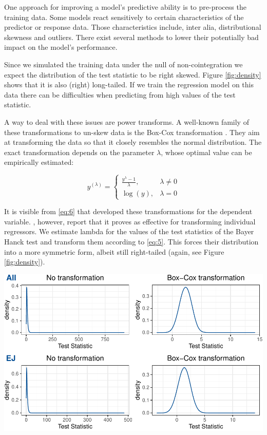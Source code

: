 \documentclass[12pt,a4paper]{article}
\let\origfigure\figure
\let\endorigfigure\endfigure
\renewenvironment{figure}[1][2] {
    \expandafter\origfigure\expandafter[H]
} {
    \endorigfigure
}
\begin{document}
One approach for improving a model's predictive ability is to
pre-process the training data. Some models react sensitively to certain
characteristics of the predictor or response data. Those characteristics
include, inter alia, distributional skewness and outliers. There exist
several methods to lower their potentially bad impact on the model's
performance.

Since we simulated the training data under the null of non-cointegration
we expect the distribution of the test statistic to be right skewed.
Figure \ref{fig:density} shows that it is also (right) long-tailed. If
we train the regression model on this data there can be difficulties
when predicting from high values of the test statistic.

A way to deal with these issues are power transforms. A well-known
family of these transformations to un-skew data is the Box-Cox
transformation \autocite{Boxcox_1964}. They aim at transforming the data
so that it closely resembles the normal distribution. The exact
transformation depends on the parameter \(\lambda\), whose optimal value
can be empirically estimated:

\begin{equation}
y^{(\lambda)} =
    \begin{cases}
    \frac{y^{\lambda} - 1}{\lambda}, & \lambda \neq 0 \\
    \log{(y)}, & \lambda = 0
    \end{cases}
\label{eq:6}
\end{equation}

It is visible from \eqref{eq:6} that \textcite{Boxcox_1964} developed
these transformations for the dependent variable. \textcite{Kuhn_2013},
however, report that it proves as effective for transforming individual
regressors. We estimate lambda for the values of the test statistics of
the Bayer Hanck test and transform them according to \eqref{eq:5}. This
forces their distribution into a more symmetric form, albeit still
right-tailed (again, see Figure \ref{fig:density}).

\begin{figure}
\centering
\includegraphics{p_approx_paper_files/figure-latex/density_plots-1.pdf}
\caption{\label{fig:density} Densities of the untransformed and
Box-Cox-transformed test statistic for test types all and EJ, shown for
case = 1 and \(k = 1\).}
\end{figure}
\end{document}
